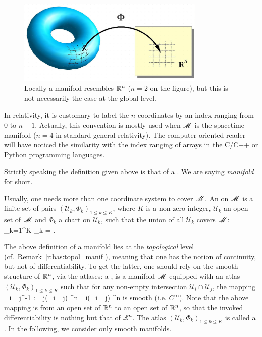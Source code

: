 \begin{figure}
\centerline{\includegraphics[width=0.8\textwidth]{bas_manifold.pdf}}
\caption[]{\label{f:bas:manifold} \footnotesize
Locally a manifold resembles $\mathbb{R}^n$ ($n=2$ on the figure), but this is not necessarily the case at the global level.}
\end{figure}

\begin{remark}
In relativity, it is customary to label the $n$ coordinates by an index
ranging from $0$ to $n-1$. Actually, this convention is mostly used when $\mathscr{M}$ is the spacetime manifold ($n=4$ in standard general relativity). The computer-oriented reader will have noticed the similarity
with the index ranging of arrays in the C/C++ or Python programming languages.
\end{remark}


\begin{remark} \label{r:bas:topol_manif}
Strictly speaking the definition given above is that of a . We are saying \emph{manifold} for short.
\end{remark}


Usually, one needs more than one coordinate system to cover $\mathscr{M}$.
An  on $\mathscr{M}$ is a finite set of pairs
$(\mathcal{U}_k,\Phi_k)_{1\leq k \leq K}$,  where $K$ is a non-zero integer, $\mathcal{U}_k$ an open set of $\mathscr{M}$ and $\Phi_k$ a chart on $\mathcal{U}_k$,
such that the union of all $\mathcal{U}_k$ covers $\mathscr{M}$:
\be
	\bigcup_{k=1}^K _k = \M.
\ee

The above definition of a manifold lies at the \emph{topological} level
(cf.~Remark~\ref{r:bas:topol_manif}), meaning that one has the notion of continuity, but not of differentiability. To get the latter, one should rely on the smooth structure of $\mathbb{R}^n$, via the atlases:
a ,
is a manifold $\mathscr{M}$ equipped with an atlas
$(\mathcal{U}_k,\Phi_k)_{1\leq k \leq K}$ such that for any non-empty intersection
$\mathcal{U}_i \cap \mathcal{U}_j$, the mapping
\be \label{e:bas:transition_map}
	\Phi_i \circ \Phi_j^{-1} : \Phi_j(_i \cap {}_j)
	\subset \R^n \longrightarrow \Phi_i(_i \cap {}_j)
	\subset \R^n
\ee
is smooth (i.e. $C^\infty$).
Note that the above mapping is from an open set of $\mathbb{R}^n$ to an open set of $\mathbb{R}^n$, so that the invoked differentiability is nothing but that of $\mathbb{R}^n$.
The atlas $(\mathcal{U}_k,\Phi_k)_{1\leq k \leq K}$ is called a
.
In the following, we consider only smooth manifolds.

